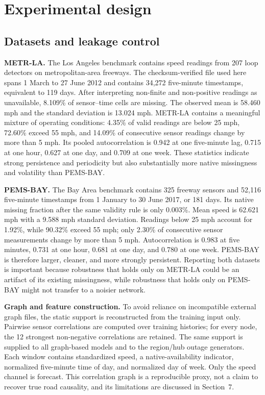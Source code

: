 \documentclass[pdflatex,sn-mathphys-num]{sn-jnl}
\begin{document}
\section{Experimental design}
\subsection{Datasets and leakage control}
\textbf{METR-LA.} The Los Angeles benchmark contains speed readings from 207
loop detectors on metropolitan-area freeways. The checksum-verified file used
here spans 1 March to 27 June 2012 and contains 34,272 five-minute timestamps,
equivalent to 119 days. After interpreting non-finite and non-positive readings
as unavailable, 8.109\% of sensor--time cells are missing. The observed mean is
58.460 mph and the standard deviation is 13.024 mph. METR-LA contains a
meaningful mixture of operating conditions: 4.35\% of valid readings are below
25 mph, 72.60\% exceed 55 mph, and 14.09\% of consecutive sensor readings change
by more than 5 mph. Its pooled autocorrelation is 0.942 at one five-minute lag,
0.715 at one hour, 0.627 at one day, and 0.709 at one week. These statistics
indicate strong persistence and periodicity but also substantially more native
missingness and volatility than PEMS-BAY.

\textbf{PEMS-BAY.} The Bay Area benchmark contains 325 freeway sensors and
52,116 five-minute timestamps from 1 January to 30 June 2017, or 181 days. Its
native missing fraction after the same validity rule is only 0.003\%. Mean speed
is 62.621 mph with a 9.588 mph standard deviation. Readings below 25 mph account
for 1.92\%, while 90.32\% exceed 55 mph; only 2.30\% of consecutive sensor
measurements change by more than 5 mph. Autocorrelation is 0.983 at five
minutes, 0.731 at one hour, 0.681 at one day, and 0.780 at one week. PEMS-BAY is
therefore larger, cleaner, and more strongly persistent. Reporting both
datasets is important because robustness that holds only on METR-LA could be an
artifact of its existing missingness, while robustness that holds only on
PEMS-BAY might not transfer to a noisier network.

\textbf{Graph and feature construction.} To avoid reliance on incompatible
external graph files, the static support is reconstructed from the training
input only. Pairwise sensor correlations are computed over training histories;
for every node, the 12 strongest non-negative correlations are retained. The
same support is supplied to all graph-based models and to the region/hub outage
generators. Each window contains standardized speed, a native-availability
indicator, normalized five-minute time of day, and normalized day of week.
Only the speed channel is forecast. This correlation graph is a reproducible
proxy, not a claim to recover true road causality, and its limitations are
discussed in Section~7.
\end{document}
